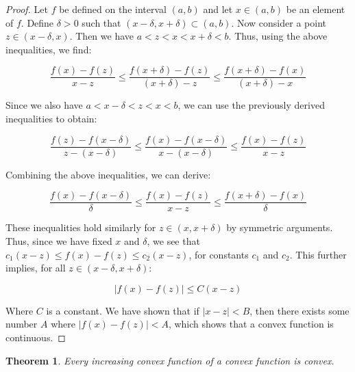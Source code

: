 \documentclass[psamsfonts]{amsart}
\newtheorem{thm}{Theorem}[section]
\theoremstyle{definition}
\theoremstyle{remark}
\numberwithin{equation}{section}
\begin{document}
\begin{proof}
Let $f$ be defined on the interval $(a,b)$ and let $x \in (a,b)$ be an element of $f$. Define $\delta >0$ such that $(x - \delta, x + \delta) \subset (a,b)$. Now consider a point $z \in (x - \delta, x)$. Then we have $a < z < x < x + \delta < b$. Thus, using the above inequalities, we find:

\begin{equation}
\frac{f(x) - f(z)}{x - z} \leq \frac{f(x + \delta) - f(z)}{(x + \delta) - z} \leq \frac{f(x + \delta) - f(x)}{(x + \delta) - x}
\end{equation}

Since we also have $a < x - \delta < z < x < b$, we can use the previously derived inequalities to obtain:

\begin{equation}
\frac{f(z) - f(x - \delta)}{z - (x - \delta)} \leq \frac{f(x) - f(x - \delta)}{x - (x - \delta)} \leq \frac{f(x) - f(z)}{x - z}
\end{equation}

Combining the above inequalities, we can derive:

\begin{equation}
\frac{f(x) - f(x - \delta)}{\delta} \leq \frac{f(x) - f(z)}{x - z} \leq \frac{f(x + \delta ) - f(x)}{\delta}
\end{equation}

These inequalities hold similarly for $z \in (x, x + \delta)$ by symmetric arguments. Thus, since we have fixed $x$ and $\delta$, we see that $c_1 (x - z) \leq f(x) - f(z) \leq c_2 (x-z)$, for constants $c_1$ and $c_2$. This further implies, for all $z \in (x - \delta, x + \delta)$:

\begin{equation}
| f(x) - f(z) | \leq C (x - z)
\end{equation}

Where $C$ is a constant. We have shown that if $| x - z| < B$, then there exists some number $A$ where $| f(x) - f(z) | < A$, which shows that a convex function is continuous.
\end{proof}

\begin{thm}
Every increasing convex function of a convex function is convex.
\end{thm}
\end{document}
